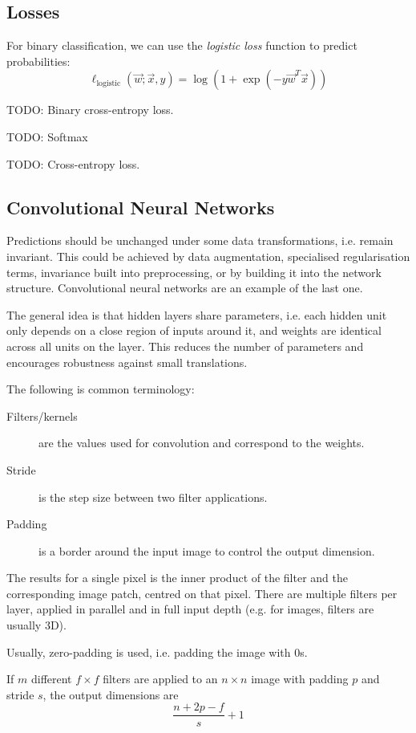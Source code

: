 \subsection{Losses}
For binary classification, we can use the
\emph{logistic loss} function to predict
probabilities:
\begin{equation*}
    \ell_\text{logistic}(\vec{w}; \vec{x}, y) =
    \log{(1 + \exp{(- y \vec{w}^T \vec{x})})}
\end{equation*}

TODO: Binary cross-entropy loss.

TODO: Softmax

TODO: Cross-entropy loss.


\subsection{Convolutional Neural Networks}
Predictions should be unchanged under some data transformations,
i.e. remain invariant.
This could be achieved by data augmentation,
specialised regularisation terms,
invariance built into preprocessing,
or by building it into the network structure.
Convolutional neural networks are an example of the last one.

The general idea is that hidden layers share parameters,
i.e. each hidden unit only depends on a close region of inputs
around it,
and weights are identical across all units on the layer.
This reduces the number of parameters
and encourages robustness against small translations.

The following is common terminology:
\begin{description}
    \item[Filters/kernels] are the values used for convolution
    and correspond to the weights.
    \item[Stride] is the step size between
    two filter applications.
    \item[Padding] is a border around the input image to control the output dimension.
\end{description}

The results for a single pixel is the inner product
of the filter and the corresponding
image patch, centred on that pixel.
There are multiple filters per layer, applied in parallel
and in full input depth
(e.g. for images, filters are usually 3D).

Usually, zero-padding is used, i.e. padding the image with $0$s.

If $m$ different $f \times f$ filters are applied
to an $n \times n$ image
with padding $p$ and stride $s$,
the output dimensions are
\begin{equation*}
    \frac{n + 2p - f}{s} + 1
\end{equation*}

